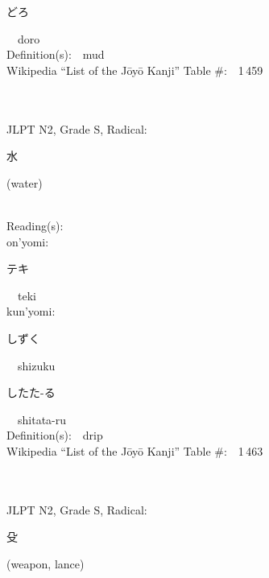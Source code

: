 \begin{multicols}{2}
{\hspace*{2em}}{\begin{CJK}{UTF8}{min} どろ \end{CJK}}\ \ doro\ \ \\
Definition(s):\ \ mud \\
Wikipedia ``List of the J\=oy\=o Kanji'' Table \#:\ \ 1\,459 \\
\ \ \\
{\fontsize{34pt}{40pt}  }\ \ \\  %
{JLPT N2, Grade S, Radical:\ \ {\begin{CJK}{UTF8}{min} 水 \end{CJK}} (water) } \\
Reading(s):\ \ \\
{\hspace*{1em}}on'yomi:\ \ \\
{\hspace*{2em}}{\begin{CJK}{UTF8}{min} テキ \end{CJK}}\ \ teki\ \ \\
{\hspace*{1em}}kun'yomi:\ \ \\
{\hspace*{2em}}{\begin{CJK}{UTF8}{min} しずく \end{CJK}}\ \ shizuku\ \ \\
{\hspace*{2em}}{\begin{CJK}{UTF8}{min} したた-る \end{CJK}}\ \ shitata-ru\ \ \\
Definition(s):\ \ drip \\
Wikipedia ``List of the J\=oy\=o Kanji'' Table \#:\ \ 1\,463 \\
\ \ \\
{\fontsize{34pt}{40pt}  }\ \ \\  %
{JLPT N2, Grade S, Radical:\ \ {\begin{CJK}{UTF8}{min} 殳 \end{CJK}} (weapon, lance) } \\

\end{multicols}
